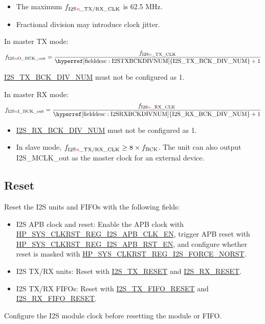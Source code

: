 \documentclass[main\_\_EN.tex]{subfiles}
\begin{document}
\begin{tiplisting}
\begin{itemize}
    \item The maximum $f_{\mathrm{I2S\regindex{n}\_TX/RX\_CLK}}$ is 62.5 MHz.
    \item Fractional division may introduce clock jitter.
\end{itemize}
\end{tiplisting}

In master TX mode:
$$f_{\mathrm{I2S\regindex{n}O\_BCK\_out}} = \frac{f_{\mathrm{I2S\regindex{n}\_TX\_CLK}}}{\mathrm{\hyperref[fielddesc:I2STXBCKDIVNUM]{I2S\_TX\_BCK\_DIV\_NUM}} + 1}$$
\begin{tiplisting}
\hyperref[fielddesc:I2STXBCKDIVNUM]{I2S\_TX\_BCK\_DIV\_NUM} must not be configured as 1.
\end{tiplisting}

In master RX mode:
$$f_{\mathrm{I2S\regindex{n}I\_BCK\_out}} = \frac{f_{\mathrm{I2S\regindex{n}\_RX\_CLK}}}{\mathrm{\hyperref[fielddesc:I2SRXBCKDIVNUM]{I2S\_RX\_BCK\_DIV\_NUM}} + 1}$$
\begin{tiplisting}
\begin{itemize}
    \item \hyperref[fielddesc:I2SRXBCKDIVNUM]{I2S\_RX\_BCK\_DIV\_NUM} must not be configured as 1.
    \item In slave mode, $f_{\mathrm{I2S\regindex{n}\_TX/RX\_CLK}} \geq 8 \times f_{\mathrm{BCK}}$. The unit can also output I2S\_MCLK\_out as the master clock for an external device.
\end{itemize}
\end{tiplisting}

\subsection{Reset}\label{sec:i2s-reset}

Reset the I2S units and FIFOs with the following fields:
\begin{itemize}
    \item I2S APB clock and reset: Enable the APB clock with \hyperref[fielddesc:HPSYSCLKRSTREGI2S0APBCLKEN]{HP\_SYS\_CLKRST\_REG\_I2S\_APB\_CLK\_EN}, trigger APB reset with \hyperref[fielddesc:HPSYSCLKRSTREGI2S0APBRSTEN]{HP\_SYS\_CLKRST\_REG\_I2S\_APB\_RST\_EN}, and configure whether reset is masked with \hyperref[fielddesc:HPSYSCLKRSTREGI2S0FORCENORST]{HP\_SYS\_CLKRST\_REG\_I2S\_FORCE\_NORST}.
    \item I2S TX/RX units: Reset with \hyperref[fielddesc:I2STXRESET]{I2S\_TX\_RESET} and \hyperref[fielddesc:I2SRXRESET]{I2S\_RX\_RESET}.
    \item I2S TX/RX FIFOs: Reset with \hyperref[fielddesc:I2STXFIFORESET]{I2S\_TX\_FIFO\_RESET} and \hyperref[fielddesc:I2SRXFIFORESET]{I2S\_RX\_FIFO\_RESET}.
\end{itemize}
\begin{tiplisting}
Configure the I2S module clock before resetting the module or FIFO.
\end{tiplisting}
\end{document}
